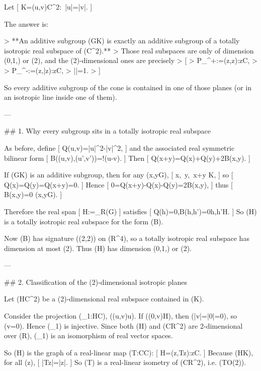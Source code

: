 Let
[
K={(u,v)\in \mathbf C^2:\ |u|=|v|}.
]

The answer is:

> **An additive subgroup (G\subset K) is exactly an additive subgroup of a totally isotropic real subspace of (\mathbf C^2).**
> Those real subspaces are only of dimension (0,1,) or (2), and the (2)-dimensional ones are precisely
> [
> P_\lambda^{+}:={(z,\lambda z):z\in \mathbf C},
> \qquad
> P_\lambda^{-}:={(z,\lambda \bar z):z\in \mathbf C},
> \qquad |\lambda|=1.
> ]

So every additive subgroup of the cone is contained in one of those planes (or in an isotropic line inside one of them).

---

## 1. Why every subgroup sits in a totally isotropic real subspace

As before, define
[
Q(u,v)=|u|^2-|v|^2,
]
and the associated real symmetric bilinear form
[
B\big((u,v),(u',v')\big)=\Re!\big(u-v\big).
]
Then
[
Q(x+y)=Q(x)+Q(y)+2B(x,y).
]

If (G\subset K) is an additive subgroup, then for any (x,y\in G),
[
x,\ y,\ x+y \in K,
]
so
[
Q(x)=Q(y)=Q(x+y)=0.
]
Hence
[
0=Q(x+y)-Q(x)-Q(y)=2B(x,y),
]
thus
[
B(x,y)=0 \qquad (x,y\in G).
]

Therefore the real span
[
H:=_{\mathbf R}(G)
]
satisfies
[
Q(h)=0,\qquad B(h,h')=0\quad \forall h,h'\in H.
]
So (H) is a totally isotropic real subspace for the form (B).

Now (B) has signature ((2,2)) on (\mathbf R^4), so a totally isotropic real subspace has dimension at most (2). Thus (H) has dimension (0,1,) or (2).

---

## 2. Classification of the (2)-dimensional isotropic planes

Let (H\subset \mathbf C^2) be a (2)-dimensional real subspace contained in (K).

Consider the projection (\pi_1:H\to \mathbf C), ((u,v)\mapsto u).
If ((0,v)\in H), then (|v|=|0|=0), so (v=0). Hence (\pi_1) is injective. Since both (H) and (\mathbf C\cong \mathbf R^2) are 2-dimensional over (\mathbf R), (\pi_1) is an isomorphism of real vector spaces.

So (H) is the graph of a real-linear map (T:\mathbf C\to \mathbf C):
[
H={(z,Tz):z\in \mathbf C}.
]
Because (H\subset K), for all (z),
[
|Tz|=|z|.
]
So (T) is a real-linear isometry of (\mathbf C\simeq \mathbf R^2), i.e. (T\in O(2)).

